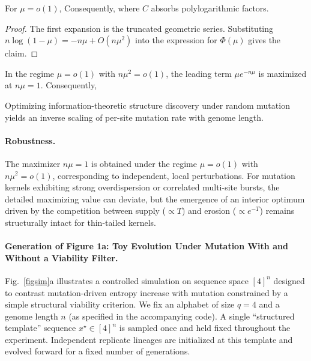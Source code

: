 \begin{lemma}\label{lem:si:smallmu}
For $\mu=o(1)$,
Consequently,
where $C$ absorbs polylogarithmic factors.
\end{lemma}

\begin{proof}
The first expansion is the truncated geometric series. Substituting
$n\log(1-\mu)=-n\mu+O(n\mu^2)$ into the expression for $\Phi(\mu)$ gives the claim.
\end{proof}

\begin{theorem}\label{thm:si:opt}
In the regime $\mu=o(1)$ with $n\mu^2=o(1)$, the leading term $\mu e^{-n\mu}$ is maximized at $n\mu=1$.
Consequently,
\end{theorem}

\begin{corollary}\label{cor:si:drake}
Optimizing information-theoretic structure discovery under random mutation yields an inverse scaling of per-site
mutation rate with genome length.
\end{corollary}

\paragraph{Robustness.}
The maximizer $n\mu=1$ is obtained under the regime $\mu=o(1)$ with $n\mu^2=o(1)$, corresponding to independent, local perturbations. For mutation kernels exhibiting strong overdispersion or correlated multi-site bursts, the detailed maximizing value can deviate, but the emergence of an interior optimum driven by the competition between supply ($\propto T$) and erosion ($\propto e^{-T}$) remains structurally intact for thin-tailed kernels.



\paragraph*{Generation of Figure 1a: Toy Evolution Under Mutation With and Without a Viability Filter.}

Fig.~\ref{figsim}a illustrates a controlled simulation on sequence space $[4]^n$ designed to contrast mutation-driven entropy increase with mutation constrained by a simple structural viability criterion. We fix an alphabet of size $q=4$ and a genome length $n$ (as specified in the accompanying code). A single ``structured template'' sequence $x^\star \in [4]^n$ is sampled once and held fixed throughout the experiment. Independent replicate lineages are initialized at this template and evolved forward for a fixed number of generations.

